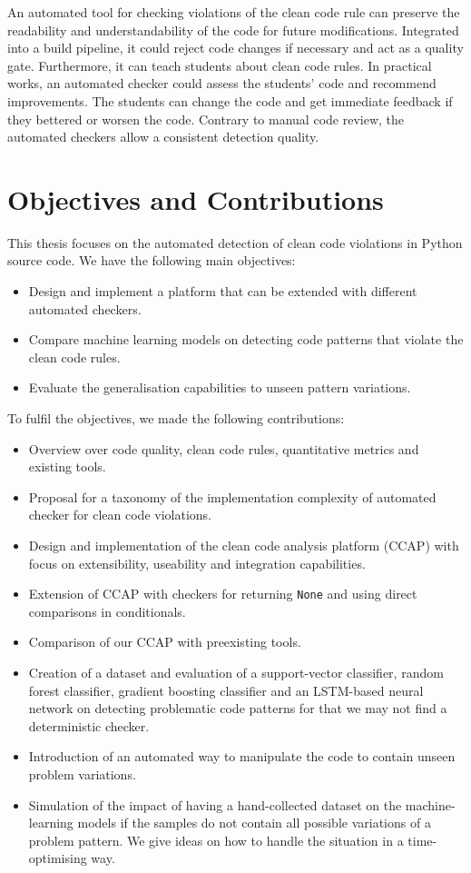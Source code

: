 An automated tool for checking violations of the clean code rule can preserve the readability and understandability of the code for future modifications. Integrated into a build pipeline, it could reject code changes if necessary and act as a quality gate.
Furthermore, it can teach students about clean code rules. In practical works, an automated checker could assess the students' code and recommend improvements. The students can change the code and get immediate feedback if they bettered or worsen the code. Contrary to manual code review, the automated checkers allow a consistent detection quality.


\section{Objectives and Contributions}
This thesis focuses on the automated detection of clean code violations in Python source code. 
We have the following main objectives:
\begin{itemize}
    \item Design and implement a platform that can be extended with different automated checkers.
    \item Compare machine learning models on detecting code patterns that violate the clean code rules.
    \item Evaluate the generalisation capabilities to unseen pattern variations.  
\end{itemize}

To fulfil the objectives, we made the following contributions:
\begin{itemize}
    \item Overview over code quality, clean code rules, quantitative metrics and existing tools.
    \item Proposal for a taxonomy of the implementation complexity of automated checker for clean code violations.
    \item Design and implementation of the clean code analysis platform (CCAP) with focus on extensibility, useability and integration capabilities.
    \item Extension of CCAP with checkers for returning \texttt{None} and using direct comparisons in conditionals.
    \item Comparison of our CCAP with preexisting tools.
    \item Creation of a dataset and evaluation of a support-vector classifier, random forest classifier, gradient boosting classifier and an LSTM-based neural network on detecting problematic code patterns for that we may not find a deterministic checker.
    \item Introduction of an automated way to manipulate the code to contain unseen problem variations.
    \item Simulation of the impact of having a hand-collected dataset on the machine-learning models if the samples do not contain all possible variations of a problem pattern. We give ideas on how to handle the situation in a time-optimising way.
\end{itemize}

